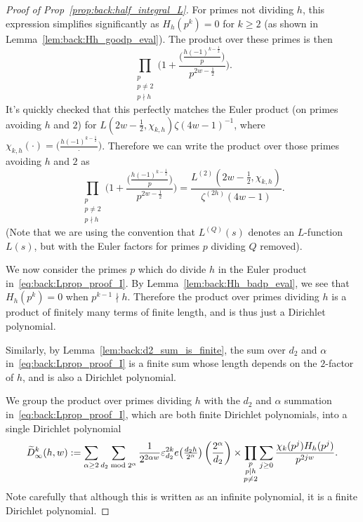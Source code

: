 \begin{proof}[Proof of Prop~\ref{prop:back:half_integral_L}]
  For primes not dividing $h$, this expression simplifies significantly as $H_h(p^k) = 0$
  for $k \geq 2$ (as shown in Lemma~\ref{lem:back:Hh_goodp_eval}).
  The product over these primes is then
  \begin{equation}
    \prod_{\substack{p \\ p \neq 2 \\ p \nmid h}} \Big( 1 + \frac{\big(\frac{h (-1)^{k -
    \frac{1}{2}}}{p}\big)} {p^{2w - \frac{1}{2}}} \Big).
  \end{equation}
  It's quickly checked that this perfectly matches the Euler product (on primes avoiding
  $h$ and $2$) for $L(2w-\frac{1}{2}, \chi_{k,h}) \zeta(4w-1)^{-1}$, where
  $\chi_{k,h}(\cdot) = \big( \frac{h (-1)^{k - \frac{1}{2}}}{\cdot} \big)$.
  Therefore we can write the product over those primes avoiding $h$ and $2$ as
  \begin{equation}
    \prod_{\substack{p \\ p \neq 2 \\ p \nmid h}} \Big( 1 + \frac{\big(\frac{h (-1)^{k -
    \frac{1}{2}}}{p}\big)} {p^{2w - \frac{1}{2}}} \Big)
    =
    \frac{L^{(2)} (2w - \frac{1}{2}, \chi_{k,h})}{\zeta^{(2h)}(4w-1)}.
  \end{equation}
  (Note that we are using the convention that $L^{(Q)}(s)$ denotes an $L$-function $L(s)$,
  but with the Euler factors for primes $p$ dividing $Q$ removed).


  We now consider the primes $p$ which do divide $h$ in the Euler product
  in~\eqref{eq:back:Lprop_proof_I}.
  By Lemma~\ref{lem:back:Hh_badp_eval}, we see that $H_h(p^k) = 0$ when $p^{k-1} \nmid h$.
  Therefore the product over primes dividing $h$ is a product of finitely many terms of
  finite length, and is thus just a Dirichlet polynomial.


  Similarly, by Lemma~\ref{lem:back:d2_sum_is_finite}, the sum over $d_2$ and $\alpha$
  in~\eqref{eq:back:Lprop_proof_I} is a finite sum whose length depends on the $2$-factor
  of $h$, and is also a Dirichlet polynomial.


  We group the product over primes dividing $h$ with the $d_2$ and $\alpha$ summation
  in~\eqref{eq:back:Lprop_proof_I}, which are both finite Dirichlet polynomials, into a
  single Dirichlet polynomial
  \begin{equation}
    \begin{split}
      \widetilde{D}_\infty^k (h,w) :=
      \sum_{\alpha \geq 2} \sum_{d_2 \bmod 2^\alpha}
        \frac{1}{2^{2\alpha w}} \varepsilon_{d_2}^{2k} e \big( \tfrac{d_2 h}{2^\alpha} \big)
        \left(\frac{2^\alpha}{d_2}\right)
      \times
      \prod_{\substack{p \\ p \mid h \\ p \neq 2}}
        \sum_{j \geq 0} \frac{\chi_k(p^j) H_h(p^j)}{p^{2jw}}.
    \end{split}
  \end{equation}
  Note carefully that although this is written as an infinite polynomial, it is a finite
  Dirichlet polynomial.



\end{proof}
